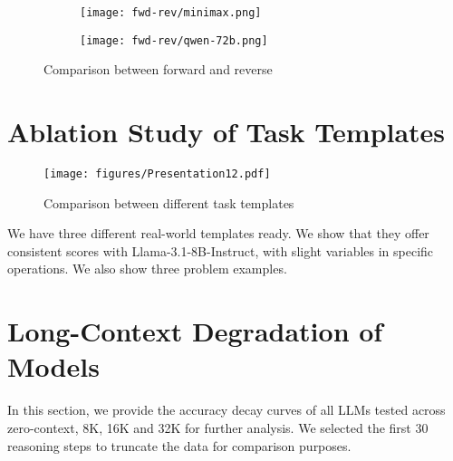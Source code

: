 \begin{figure}[h] 
  \centering
  \begin{subfigure}[b]{0.3\textwidth}
    \texttt{[image: fwd-rev/minimax.png]} 
  \end{subfigure} 
  \hspace{0.05\textwidth} %
  \begin{subfigure}[b]{0.3\textwidth} 
    \texttt{[image: fwd-rev/qwen-72b.png]} 
  \end{subfigure} 
  \caption{Comparison between forward and reverse}
  \label{fig:forwardreverse} 
\end{figure} 

\newpage

\section{Ablation Study of Task Templates}
\label{templates} 
\begin{figure}[h!]
  \texttt{[image: figures/Presentation12.pdf]} 
  \caption{Comparison between different task templates}
  \label{languagetemplates} 
\end{figure} 

We have three different real-world templates ready. We show that they offer consistent scores with Llama-3.1-8B-Instruct, with slight variables in specific operations. We also show three problem examples. 



\newpage

\section{Long-Context Degradation of Models} 
\label{picutrall} 
In this section, we provide the accuracy decay curves of all LLMs tested across zero-context, 8K, 16K and 32K for further analysis. We selected the first 30 reasoning steps to truncate the data for comparison purposes. 

